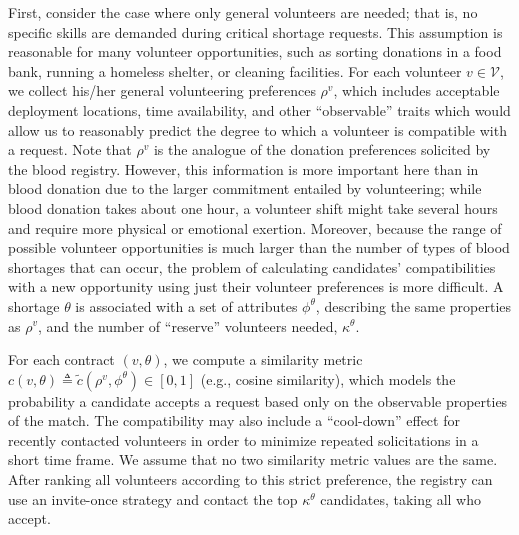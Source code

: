 \documentclass[11pt, margin=1in]{article}
\begin{document}
First, consider the case where only general volunteers are needed; that is, no specific skills are demanded during critical shortage requests. This assumption is reasonable for many volunteer opportunities, such as sorting donations in a food bank, running a homeless shelter, or cleaning facilities. For each volunteer $v \in \mathcal{V}$, we collect his/her general volunteering preferences $\rho^v$, which includes acceptable deployment locations, time availability, and other ``observable'' traits which would allow us to reasonably predict the degree to which a volunteer is compatible with a request. Note that $\rho^v$ is the analogue of the donation preferences solicited by the blood registry. However, this information is more important here than in blood donation due to the larger commitment entailed by volunteering; while blood donation takes about one hour, a volunteer shift might take several hours and require more physical or emotional exertion. Moreover, because the range of possible volunteer opportunities is much larger than the number of types of blood shortages that can occur, the problem of calculating candidates' compatibilities with a new opportunity using just their volunteer preferences is more difficult. A shortage $\theta$ is associated with a set of attributes $\phi^\theta$, describing the same properties as $\rho^v$, and the number of ``reserve'' volunteers needed, $\kappa^\theta$. 

For each contract $(v, \theta)$, we compute a similarity metric $c(v, \theta) \triangleq \tilde{c}(\rho^v, \phi^\theta) \in [0, 1]$ (e.g., cosine similarity), which models the probability a candidate accepts a request based only on the observable properties of the match. The compatibility may also include a ``cool-down'' effect for recently contacted volunteers in order to minimize repeated solicitations in a short time frame. We assume that no two similarity metric values are the same. After ranking all volunteers according to this strict preference, the registry can use an invite-once strategy \cite{volunteer-registry} and contact the top $\kappa^\theta$ candidates, taking all who accept.
\end{document}
